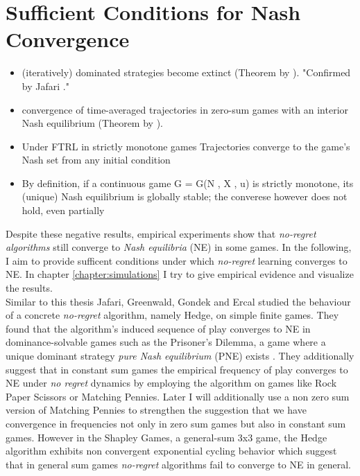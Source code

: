 \section{Sufficient Conditions for Nash Convergence}\label{section:SufficientConditionsForNash Convergence}

\begin{itemize}
    \item (iteratively) dominated strategies become extinct (Theorem by \cite{sandholm}). "Confirmed by Jafari \cite{jafari}."
    \item convergence of time-averaged trajectories in zero-sum games with an interior Nash equilibrium (Theorem by \cite{sandholm}).
    \item Under FTRL in strictly monotone games Trajectories converge to the game’s Nash set from any initial condition 
    \item By definition, if a continuous game G = G(N , X , u) is strictly monotone, its (unique) Nash equilibrium is globally stable; the converese however does not hold, even partially \cite{HDRmertikopoulos}
    
\end{itemize}

Despite these negative results, empirical experiments show that \textit{no-regret algorithms} still converge to \textit{Nash equilibria} (NE) in some games. In the following, I aim to provide sufficent conditions under which \textit{no-regret} learning converges to NE. In chapter \ref{chapter:simulations} I try to give empirical evidence and visualize the results. \\

Similar to this thesis Jafari, Greenwald, Gondek and Ercal studied the behaviour of a concrete \textit{no-regret} algorithm, namely Hedge, on simple finite games. They found that the algorithm's induced sequence of play converges to NE in dominance-solvable games such as the Prisoner's Dilemma, a game where a unique dominant strategy \textit{pure Nash equilibrium} (PNE) exists \cite{jafari}. They additionally suggest that in constant sum games the empirical frequency of play converges to NE under \textit{no regret} dynamics by employing the algorithm on games like Rock Paper Scissors or Matching Pennies. Later I will additionally use a non zero sum version of Matching Pennies to strengthen the suggestion that we have convergence in frequencies not only in zero sum games but also in constant sum games. However in the Shapley Games, a general-sum 3x3 game, the Hedge algorithm exhibits non convergent exponential cycling behavior \cite{jafari} which suggest that in general sum games \textit{no-regret} algorithms fail to converge to NE in general.\\

